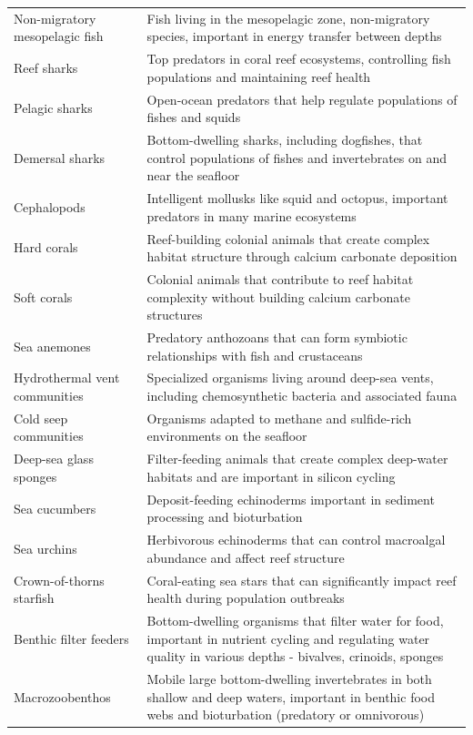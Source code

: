 \begin{longtable}{p{}p{}}
  Non-migratory mesopelagic fish & Fish living in the mesopelagic zone, non-migratory species, important in energy transfer between depths \\
  Reef sharks & Top predators in coral reef ecosystems, controlling fish populations and maintaining reef health \\
  Pelagic sharks & Open-ocean predators that help regulate populations of fishes and squids \\
  Demersal sharks & Bottom-dwelling sharks, including dogfishes, that control populations of fishes and invertebrates on and near the seafloor \\
  Cephalopods & Intelligent mollusks like squid and octopus, important predators in many marine ecosystems \\
  Hard corals & Reef-building colonial animals that create complex habitat structure through calcium carbonate deposition \\
  Soft corals & Colonial animals that contribute to reef habitat complexity without building calcium carbonate structures \\
  Sea anemones & Predatory anthozoans that can form symbiotic relationships with fish and crustaceans \\
  Hydrothermal vent communities & Specialized organisms living around deep-sea vents, including chemosynthetic bacteria and associated fauna \\
  Cold seep communities & Organisms adapted to methane and sulfide-rich environments on the seafloor \\
  Deep-sea glass sponges & Filter-feeding animals that create complex deep-water habitats and are important in silicon cycling \\
  Sea cucumbers & Deposit-feeding echinoderms important in sediment processing and bioturbation \\
  Sea urchins & Herbivorous echinoderms that can control macroalgal abundance and affect reef structure \\
  Crown-of-thorns starfish & Coral-eating sea stars that can significantly impact reef health during population outbreaks \\
  Benthic filter feeders & Bottom-dwelling organisms that filter water for food, important in nutrient cycling and regulating water quality in various depths - bivalves, crinoids, sponges \\
  Macrozoobenthos & Mobile large bottom-dwelling invertebrates in both shallow and deep waters, important in benthic food webs and bioturbation (predatory or omnivorous) \\

\end{longtable}
